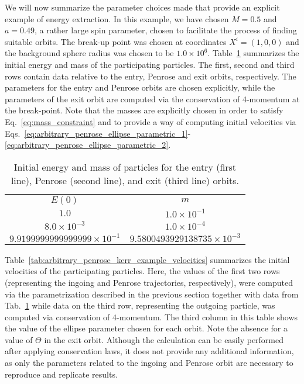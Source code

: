We will now summarize the parameter choices made that provide an explicit example of energy extraction. In this example, we have chosen $M = 0.5$ and $a = 0.49$, a rather large spin parameter, chosen to facilitate the process of finding suitable orbits. The break-up point was chosen at coordinates $X^i = (1, 0, 0)$ and the background sphere radius was chosen to be $1.0\times 10^6$. Table~\ref{tab:arbitrary_penrose_kerr_example_energy_mass} summarizes the initial energy and mass of the participating particles. The first, second and third rows contain data relative to the entry, Penrose and exit orbits, respectively. The parameters for the entry and Penrose orbits are chosen explicitly, while the parameters of the exit orbit are computed via the conservation of 4-momentum at the break-point. Note that the masses are explicitly chosen in order to satisfy Eq.~\eqref{eq:mass_constraint} and to provide a way of computing initial velocities via Eqs.~\eqref{eq:arbitrary_penrose_ellipse_parametric_1}-\eqref{eq:arbitrary_penrose_ellipse_parametric_2}.

\begin{table}[]
  \centering
  \begin{tabular}{cc}
    \hline\hline
    $E(0)$                              & $m$                                 \\
    $1.0$                               & $1.0 \times 10^{-1}$                \\
    $8.0 \times 10^{-3}$                & $1.0 \times 10^{-4}$                \\
    $9.9199999999999999 \times 10^{-1}$ & $9.5800493929138735 \times 10^{-3}$ \\ \hline\hline
  \end{tabular}
  \caption{Initial energy and mass of particles for the entry (first line), Penrose (second line), and exit (third line) orbits.}
  \label{tab:arbitrary_penrose_kerr_example_energy_mass}
\end{table}

Table~\ref{tab:arbitrary_penrose_kerr_example_velocities} summarizes the initial velocities of the participating particles. Here, the values of the first two rows (representing the ingoing and Penrose trajectories, respectively), were computed via the parametrization described in the previous section together with data from Tab.~\ref{tab:arbitrary_penrose_kerr_example_energy_mass} while data on the third row, representing the outgoing particle, was computed via conservation of 4-momentum. The third column in this table shows the value of the ellipse parameter chosen for each orbit. Note the absence for a value of $\Theta$ in the exit orbit. Although the calculation can be easily performed after applying conservation laws, it does not provide any additional information, as only the parameters related to the ingoing and Penrose orbit are necessary to reproduce and replicate results.


